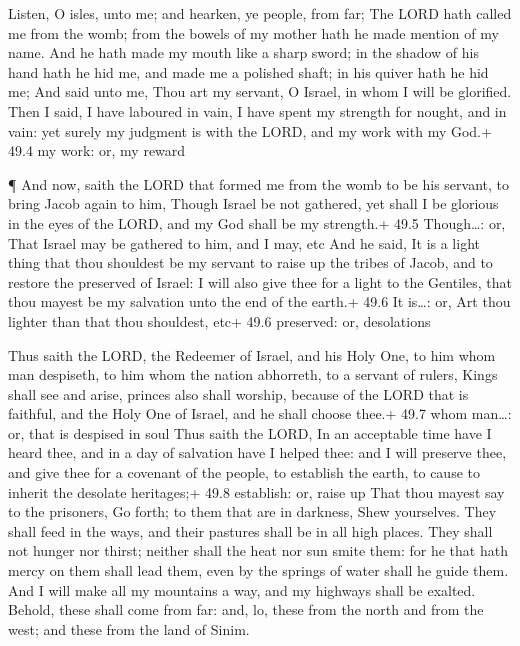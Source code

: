  Listen, O isles, unto me; and hearken, ye people, from far;
The LORD hath called me from the womb; from the bowels of my mother hath
he made mention of my name.  And he hath made my mouth like
a sharp sword; in the shadow of his hand hath he hid me, and made me a
polished shaft; in his quiver hath he hid me;  And said unto
me, Thou art my servant, O Israel, in whom I will be glorified.
 Then I said, I have laboured in vain, I have spent my
strength for nought, and in vain: yet surely my judgment is with the
LORD, and my work with my God.+ 49.4 my work: or, my reward

 ¶ And now, saith the LORD that formed me from the womb to
be his servant, to bring Jacob again to him, Though Israel be not
gathered, yet shall I be glorious in the eyes of the LORD, and my God
shall be my strength.+ 49.5 Though\ldots: or, That Israel may be
gathered to him, and I may, etc  And he said, It is a light
thing that thou shouldest be my servant to raise up the tribes of Jacob,
and to restore the preserved of Israel: I will also give thee for a
light to the Gentiles, that thou mayest be my salvation unto the end of
the earth.+ 49.6 It is\ldots: or, Art thou lighter than that thou
shouldest, etc+ 49.6 preserved: or, desolations

 Thus saith the LORD, the Redeemer of Israel, and his Holy
One, to him whom man despiseth, to him whom the nation abhorreth, to a
servant of rulers, Kings shall see and arise, princes also shall
worship, because of the LORD that is faithful, and the Holy One of
Israel, and he shall choose thee.+ 49.7 whom man\ldots: or, that is
despised in soul  Thus saith the LORD, In an acceptable time
have I heard thee, and in a day of salvation have I helped thee: and I
will preserve thee, and give thee for a covenant of the people, to
establish the earth, to cause to inherit the desolate heritages;+ 49.8
establish: or, raise up  That thou mayest say to the
prisoners, Go forth; to them that are in darkness, Shew yourselves. They
shall feed in the ways, and their pastures shall be in all high places.
 They shall not hunger nor thirst; neither shall the heat
nor sun smite them: for he that hath mercy on them shall lead them, even
by the springs of water shall he guide them.  And I will
make all my mountains a way, and my highways shall be exalted.
 Behold, these shall come from far: and, lo, these from the
north and from the west; and these from the land of Sinim.


